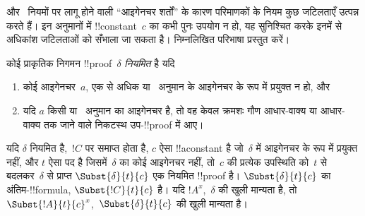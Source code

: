 \documentclass[../../../include/open-logic-section]{subfiles}
\begin{document}


\Elim{\lexists} और~\Intro{\lforall} नियमों पर लागू होने वाली ``आइगेनचर
शर्तों'' के कारण परिमाणकों के नियम कुछ जटिलताएँ उत्पन्न करते हैं। इन अनुमानों
में !!{constant}~$c$ का कभी पुनः उपयोग न हो, यह सुनिश्चित करके इनमें से
अधिकांश जटिलताओं को सँभाला जा सकता है। निम्नलिखित परिभाषा प्रस्तुत करें।

\begin{defn}
कोई प्राकृतिक निगमन !!{proof}~$\delta$ \emph{नियमित} है यदि
\begin{enumerate}
  \item कोई आइगेनचर~$a$, एक से अधिक \Elim{\lexists} या~\Intro{\lforall}
  अनुमान के आइगेनचर के रूप में प्रयुक्त न हो, और
  \item यदि $a$ किसी \Elim{\lexists} या~\Intro{\lforall} अनुमान का आइगेनचर
  है, तो वह केवल क्रमशः गौण आधार-वाक्य या आधार-वाक्य तक जाने वाले निकटस्थ
  उप-!!{proof} में आए।
\end{enumerate}
\end{defn}

\begin{lem} यदि $\delta$ नियमित है,~$!C$ पर
समाप्त होता है, $c$ ऐसा !!a{constant} है जो~$\delta$ में आइगेनचर के रूप में
प्रयुक्त नहीं, और $t$ ऐसा पद है जिसमें~$\delta$ का कोई आइगेनचर नहीं, तो~$c$
की प्रत्येक उपस्थिति को~$t$ से बदलकर~$\delta$ से प्राप्त
$\Subst{\delta}{t}{c}$ एक नियमित !!{proof} है। $\Subst{\delta}{t}{c}$ का
अंतिम-!!{formula}, $\Subst{!C}{t}{c}$ है। यदि $!A^x$,~$\delta$ की खुली
मान्यता है, तो $\Subst{!A}{t}{c}^x$,~$\Subst{\delta}{t}{c}$ की खुली मान्यता
है।
\end{lem}
\end{document}
